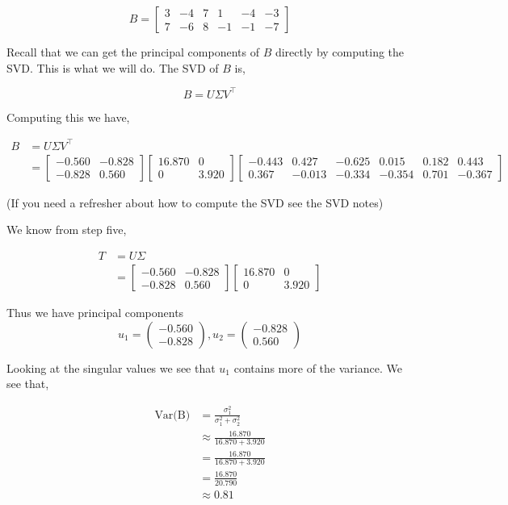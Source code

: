 \documentclass{article}
\begin{document}
$$B=\begin{bmatrix}
3&-4&7&1&-4&-3\\
7&-6&8&-1&-1&-7
\end{bmatrix}$$

Recall that we can get the principal components of $B$ directly by computing the SVD. This is what we will do. The SVD of $B$ is,

$$B=U\Sigma V^\top$$

Computing this we have,

\begin{align}
B&=U\Sigma V^\top\\
&=\begin{bmatrix}
-0.560&-0.828\\
-0.828&0.560\end{bmatrix}
\begin{bmatrix}
16.870&0\\
0&3.920
\end{bmatrix}
\begin{bmatrix}-0.443&0.427&-0.625&0.015&0.182&0.443\\
0.367&-0.013&-0.334&-0.354&0.701&-0.367\end{bmatrix}
\end{align}

(If you need a refresher about how to compute the SVD see the SVD notes)

We know from step five,

\begin{align}
T&=U\Sigma\\
&=\begin{bmatrix}
-0.560&-0.828\\
-0.828&0.560\end{bmatrix}
\begin{bmatrix}
16.870&0\\
0&3.920
\end{bmatrix}
\end{align}

Thus we have principal components
$$u_1=\begin{pmatrix}
-0.560\\
-0.828\end{pmatrix},u_2=\begin{pmatrix}
-0.828\\
0.560\end{pmatrix}$$

Looking at the singular values we see that $u_1$ contains more of the variance. We see that,

\begin{align}
\text{Var(B)}&=\frac{\sigma^2_1}{\sigma^2_1+\sigma^2_2}\\
&\approx\frac{16.870}{16.870+3.920}\\
&=\frac{16.870}{16.870+3.920}\\
&=\frac{16.870}{20.790}\\
&\approx 0.81
\end{align}
\end{document}
